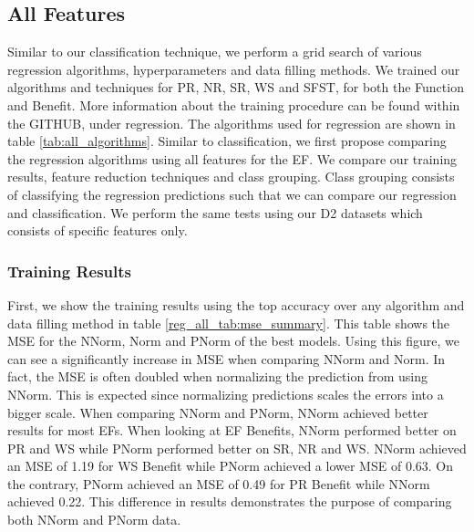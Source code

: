 \documentclass[12pt,letterpaper]{article}
\begin{document}
\subsection{All Features}
Similar to our classification technique, we perform a grid search of various regression algorithms, hyperparameters and data filling methods.
We trained our algorithms and techniques for \ac{PR}, \ac{NR}, \ac{SR}, \ac{WS} and \ac{SFST}, for both the Function and Benefit.
More information about the training procedure can be found within the GITHUB, under regression.
The algorithms used for regression are shown in table \ref{tab:all_algorithms}.
Similar to classification, we first propose comparing the regression algorithms using all features for the \ac{EF}.
We compare our training results, feature reduction techniques and class grouping.
Class grouping consists of classifying the regression predictions such that we can compare our regression and classification.
We perform the same tests using our D2 datasets which consists of specific features only.

\subsubsection{Training Results}
First, we show the training results using the top accuracy over any algorithm and data filling method in table \ref{reg_all_tab:mse_summary}.
This table shows the MSE for the \ac{NNorm}, \ac{Norm} and \ac{PNorm} of the best models.
Using this figure, we can see a significantly increase in MSE when comparing \ac{NNorm} and Norm.
In fact, the MSE is often doubled when normalizing the prediction from using \ac{NNorm}.
This is expected since normalizing predictions scales the errors into a bigger scale.
When comparing \ac{NNorm} and \ac{PNorm}, \ac{NNorm} achieved better results for most \ac{EF}s.
When looking at \ac{EF} Benefits, \ac{NNorm} performed better on \ac{PR} and \ac{WS} while \ac{PNorm} performed better on \ac{SR}, \ac{NR} and \ac{WS}. 
\ac{NNorm} achieved an MSE of 1.19 for \ac{WS} Benefit while \ac{PNorm} achieved a lower MSE of 0.63.
On the contrary, \ac{PNorm} achieved an MSE of 0.49 for \ac{PR} Benefit while \ac{NNorm} achieved 0.22.
This difference in results demonstrates the purpose of comparing both \ac{NNorm} and \ac{PNorm} data. 
\end{document}
